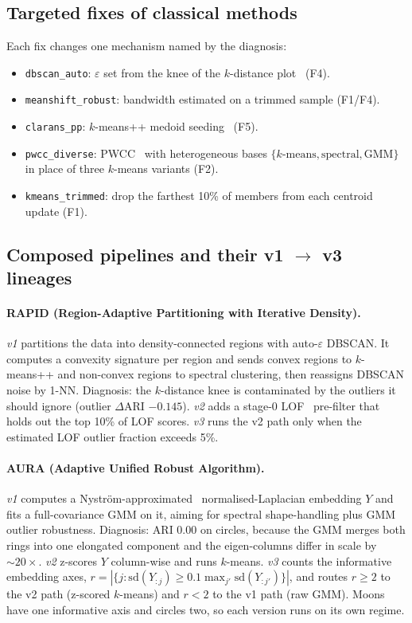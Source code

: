 \documentclass[11pt,a4paper]{article}
\newcommand{\code}[1]{\texttt{#1}}
\begin{document}
\subsection{Targeted fixes of classical methods}
Each fix changes one mechanism named by the diagnosis:
\begin{itemize}
  \item \code{dbscan\_auto}: $\varepsilon$ set from the knee of the
  $k$-distance plot~\cite{ester1996density} (F4).
  \item \code{meanshift\_robust}: bandwidth estimated on a trimmed sample
  (F1/F4).
  \item \code{clarans\_pp}: $k$-means++ medoid seeding~\cite{arthur2007kmeanspp}
  (F5).
  \item \code{pwcc\_diverse}: PWCC~\cite{alguliyev2020weighted} with
  heterogeneous bases $\{k\text{-means}, \text{spectral}, \text{GMM}\}$ in
  place of three $k$-means variants (F2).
  \item \code{kmeans\_trimmed}: drop the farthest 10\% of members from each
  centroid update (F1).
\end{itemize}

\subsection{\texorpdfstring{Composed pipelines and their v1 $\to$ v3 lineages}{Composed pipelines and their v1 to v3 lineages}}\label{sec:pipelines}

\paragraph{RAPID (Region-Adaptive Partitioning with Iterative Density).}
\emph{v1} partitions the data into density-connected regions with
auto-$\varepsilon$ DBSCAN. It computes a convexity signature per region and
sends convex regions to $k$-means++ and non-convex regions to spectral
clustering, then reassigns DBSCAN noise by 1-NN. Diagnosis: the $k$-distance
knee is contaminated by the outliers it should ignore (outlier $\Delta$ARI
$-0.145$). \emph{v2} adds a stage-0 LOF~\cite{breunig2000lof} pre-filter that
holds out the top 10\% of LOF scores. \emph{v3} runs the v2 path only when the
estimated LOF outlier fraction exceeds 5\%.

\paragraph{AURA (Adaptive Unified Robust Algorithm).}
\emph{v1} computes a Nyström-approximated~\cite{williams2001nystrom,fowlkes2004spectral}
normalised-Laplacian embedding $Y$ and fits a full-covariance GMM on it,
aiming for spectral shape-handling plus GMM outlier robustness. Diagnosis:
ARI 0.00 on circles, because the GMM merges both rings into one elongated
component and the eigen-columns differ in scale by $\sim\!20\times$.
\emph{v2} z-scores $Y$ column-wise and runs $k$-means. \emph{v3} counts the
informative embedding axes,
$r = |\{j : \mathrm{sd}(Y_{:j}) \ge 0.1\max_{j'}\mathrm{sd}(Y_{:j'})\}|$,
and routes $r \ge 2$ to the v2 path (z-scored $k$-means) and $r < 2$ to the v1
path (raw GMM). Moons have one informative axis and circles two, so each
version runs on its own regime.
\end{document}

